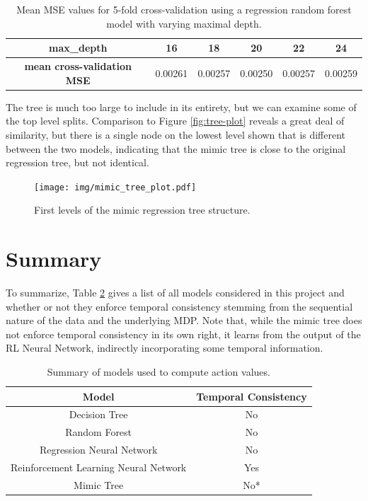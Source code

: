 \documentclass{sfuthesis}
\begin{document}
	\begin{table}[ht]
		\vspace{0.3cm}
		\centering
		\begin{tabular}{c|ccccc}
			\textbf{max\_depth}                & 16      & 18      & 20     & 22     & 24       \\ \hline
			\textbf{mean cross-validation MSE} & 0.00261 & 0.00257 & 0.00250 & 0.00257 & 0.00259
		\end{tabular}
		\caption{Mean MSE values for 5-fold cross-validation using a regression random forest model with varying maximal depth.}
		\label{tab:mimic-mse}
	\end{table}
	
	The tree is much too large to include in its entirety, but we can examine some of the top level splits. Comparison to Figure \ref{fig:tree-plot} reveals a great deal of similarity, but there is a single node on the lowest level shown that is different between the two models, indicating that the mimic tree is close to the original regression tree, but not identical.
	
	\begin{figure}[ht]
		\hspace{-3cm}
		\texttt{[image: img/mimic\_tree\_plot.pdf]}
		\caption{First levels of the mimic regression tree structure.}
		\label{fig:mimic-tree-plot}
	\end{figure}
	
	\section{Summary}
	To summarize, Table \ref{tab:model_summary} gives a list of all models considered in this project and whether or not they enforce temporal consistency stemming from the sequential nature of the data and the underlying MDP. Note that, while the mimic tree does not enforce temporal consistency in its own right, it learns from the output of the RL Neural Network, indirectly incorporating some temporal information.
	\begin{table}[ht]
		\centering
		\begin{tabular}{c|c}
			\textbf{Model} & \textbf{Temporal Consistency} \\ \hline
			Decision Tree & No \\
			Random Forest & No \\
			Regression Neural Network & No \\
			Reinforcement Learning Neural Network & Yes \\
			Mimic Tree & No* \\
		\end{tabular}
		\caption{Summary of models used to compute action values.}
		\label{tab:model_summary}
	\end{table}
	
\end{document}
